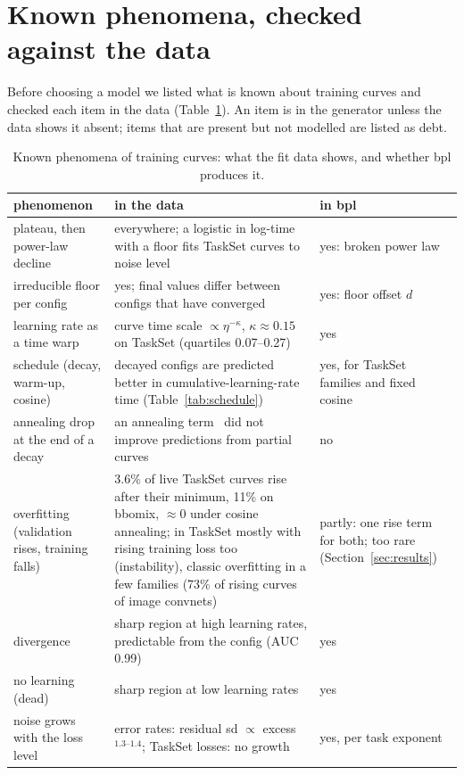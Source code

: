 \documentclass[10pt]{article}
\newcommand{\bpl}{\textsf{bpl}}
\begin{document}
\section{Known phenomena, checked against the data}
\label{sec:phenomena}

Before choosing a model we listed what is known about training curves and checked each item in the data
(Table~\ref{tab:phenomena}). An item is in the generator unless the data shows it absent; items that are present
but not modelled are listed as debt.

\begin{table}[t]
\centering\small
\caption{Known phenomena of training curves: what the fit data shows, and whether \bpl{} produces it.}
\label{tab:phenomena}
\begin{tabular}{p{3.7cm}p{6.8cm}p{4.0cm}}
\toprule
phenomenon & in the data & in \bpl{} \\
\midrule
plateau, then power-law decline & everywhere; a logistic in log-time with a floor fits TaskSet curves to noise level & yes: broken power law \\
irreducible floor per config & yes; final values differ between configs that have converged & yes: floor offset $d$ \\
learning rate as a time warp & curve time scale $\propto \eta^{-\kappa}$, $\kappa \approx 0.15$ on TaskSet (quartiles 0.07--0.27) & yes \\
schedule (decay, warm-up, cosine) & decayed configs are predicted better in cumulative-learning-rate time (Table~\ref{tab:schedule}) & yes, for TaskSet families and fixed cosine \\
annealing drop at the end of a decay & an annealing term~\cite{tissue2024scaling} did not improve predictions from partial curves & no \\
overfitting (validation rises, training falls) & 3.6\% of live TaskSet curves rise after their minimum, 11\% on bbomix, $\approx 0$ under cosine annealing; in TaskSet mostly with rising training loss too (instability), classic overfitting in a few families (73\% of rising curves of image convnets) & partly: one rise term for both; too rare (Section~\ref{sec:results}) \\
divergence & sharp region at high learning rates, predictable from the config (AUC 0.99) & yes \\
no learning (dead) & sharp region at low learning rates & yes \\
noise grows with the loss level & error rates: residual sd $\propto$ excess$^{1.3\text{--}1.4}$; TaskSet losses: no growth & yes, per task exponent \\

\end{tabular}
\end{table}
\end{document}
